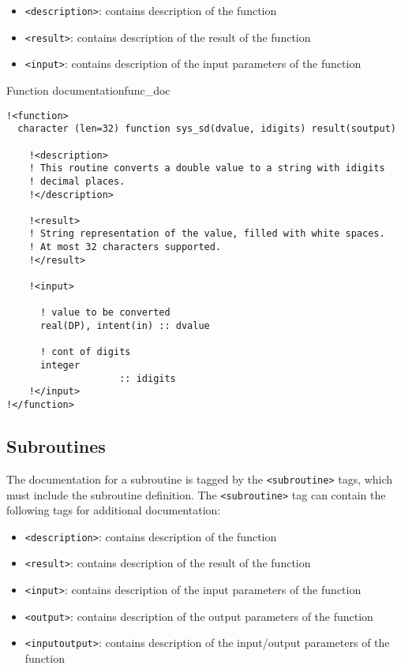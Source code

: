 \begin{itemize}
\item \verb+<description>+: contains description of the function
\item \verb+<result>+: contains description of the result of the function
\item \verb+<input>+: contains description of the input parameters of the function
\end{itemize}

\begin{code}{Function documentation}{func_doc}
\begin{verbatim}
!<function>
  character (len=32) function sys_sd(dvalue, idigits) result(soutput)

    !<description>
    ! This routine converts a double value to a string with idigits
    ! decimal places.
    !</description>

    !<result>
    ! String representation of the value, filled with white spaces.
    ! At most 32 characters supported.
    !</result>

    !<input>

      ! value to be converted
      real(DP), intent(in) :: dvalue
    
      ! cont of digits
      integer
                    :: idigits
    !</input>
!</function>
\end{verbatim}
\end{code}


\subsection{Subroutines}

The documentation for a subroutine is tagged by the \verb+<subroutine>+ tags, which
must include the subroutine definition. The \verb+<subroutine>+ tag 
can contain the following tags for additional documentation:

\begin{itemize}
\item \verb+<description>+: contains description of the function
\item \verb+<result>+: contains description of the result of the function
\item \verb+<input>+: contains description of the input parameters of the function
\item \verb+<output>+: contains description of the output parameters of the function
\item \verb+<inputoutput>+: contains description of the input/output parameters of the function
\end{itemize}


